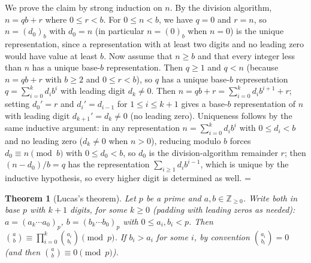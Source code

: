 \documentclass[11pt]{article}
\makeatletter
\theoremstyle{ntstyle}
\newtheorem{theorem}{Theorem}[subsection]
\let\nt@closedisplay\]
\def\nt@guardedclose{\@ifnextchar\par{\nt@closeafterpar}{\@ifnextchar\end{\postdisplaypenalty\@M\nt@closedisplay}{\nt@closedisplay}}}
\def\nt@closeafterpar\par{\@ifnextchar\par{\nt@closeafterpar}{\@ifnextchar\end{\postdisplaypenalty\@M\nt@closedisplay\par}{\nt@closedisplay\par}}}
\renewenvironment{proof}[1][\proofname]{\par
  \pushQED{\qed}\normalfont\topsep\medskipamount\edef\nt@afterproof{\@endparpenalty=\the\@endparpenalty\relax}\@beginparpenalty\@M\@endparpenalty\@M\let\]\nt@guardedclose\trivlist\item[]\textit{#1\@addpunct{.}} \ignorespaces}{\ifvmode\addpenalty\@M\fi\popQED\nt@afterproof\endtrivlist\@endpefalse}
\makeatother
\begin{document}
\begin{proof} We prove the claim by strong induction on $n$. By the
	division algorithm, $n = qb + r$ where $0 \le r < b$. For
	$0 \le n < b$, we have $q = 0$ and $r = n$, so $n = (d_0)_b$ with $d_0 = n$
	(in particular $n = (0)_b$ when $n = 0$) is the unique
	representation, since a representation with at least two digits and no leading
	zero would have value at least $b$. Now assume that $n \ge b$ and that every integer
	less than $n$ has a unique base-$b$ representation. Then $q\ge1$ and $q<n$ (because $n=qb+r$ with
	$b\ge2$ and $0\le r<b$), so $q$ has a unique base-$b$
	representation $q = \sum_{i=0}^{k} d_i b^{i}$ with leading digit $d_k
		\neq 0$. Then $n = qb + r = \sum_{i=0}^{k} d_i b^{i+1} + r$; setting
	$d_0' = r$ and $d_i' = d_{i-1}$ for $1\le i\le k+1$ gives a base-$b$
	representation of $n$ with leading digit $d_{k+1}' = d_k \neq 0$ (no leading
	zero). Uniqueness follows by the same inductive argument: in any representation
	$n = \sum_{i=0}^{k}d_i b^i$ with $0 \le d_i < b$ and no leading zero ($d_k\neq0$ when $n>0$), reducing modulo $b$
	forces $d_0 \equiv n \pmod{b}$ with $0 \le d_0 < b$, so $d_0$ is the
	division-algorithm remainder $r$; then $(n - d_0)/b = q$ has
	the representation $\sum_{i \ge 1} d_i b^{i-1}$, which is unique by the inductive
	hypothesis, so every higher digit is determined as well.
\end{proof}
\begin{theorem}[Lucas's theorem]\label{thm:4.1.2} Let $p$ be a
	prime and $a, b \in \mathbb{Z}_{\ge0}$. Write both in base $p$ with $k+1$ digits, for some $k\ge0$
	(padding with leading zeros as needed): $a = (a_k
		\cdots a_0)_p$, $b = (b_k \cdots b_0)_p$ with $0 \le a_i, b_i < p$.
	Then $\binom{a}{b} \equiv \prod_{i=0}^{k} \binom{a_i}{b_i} \pmod{p}$.
	If $b_i>a_i$ for some $i$, by convention $\binom{a_i}{b_i}=0$ (and then $\binom{a}{b}\equiv 0 \pmod{p}$).
\end{theorem}
\end{document}
